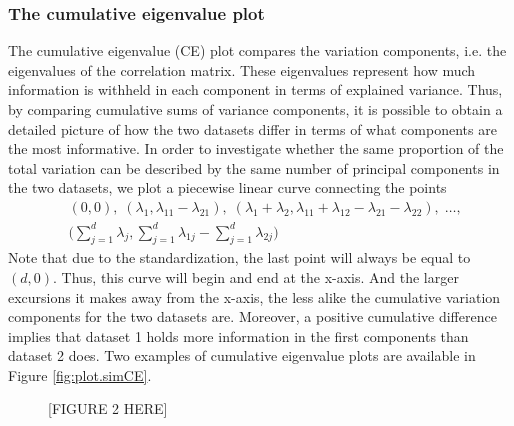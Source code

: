 \documentclass[a4paper,14pt]{article}
\begin{document}
\subsubsection*{The cumulative eigenvalue plot}
The cumulative eigenvalue (CE) plot compares the variation components, i.e. the eigenvalues of the correlation matrix. These eigenvalues represent how much information is withheld in each component in terms of explained variance. Thus, by comparing cumulative sums of variance components, it is possible to obtain a detailed picture of how the two datasets differ in terms of what components are the most informative. In order to investigate whether the same proportion of the total variation can be described by the same number of principal components in the two datasets, we plot a piecewise linear curve connecting the points
\begin{align*}
&(0,0), \;
(\lambda_1,\lambda_{11}-\lambda_{21}), \;
(\lambda_1 + \lambda_2,\lambda_{11}+\lambda_{12}-\lambda_{21}-\lambda_{22}), \;
\ldots, \\
&\bigg( \sum_{j=1}^d \lambda_j, \sum_{j=1}^d \lambda_{1j} - \sum_{j=1}^d \lambda_{2j} \bigg)
\end{align*}
Note that due to the standardization, the last point will always be equal to $(d,0)$. Thus, this curve will begin and end at the x-axis. And the larger excursions it makes away from the x-axis, the less alike the cumulative variation components for the two datasets are. Moreover, a positive cumulative difference implies that dataset 1 holds more information in the first components than dataset 2 does. Two examples of cumulative eigenvalue plots are available in Figure \ref{fig:plot.simCE}.

\begin{figure}[!h]
\caption{[FIGURE 2 HERE]}
\label{plot.simCE}
\end{figure}
\end{document}
